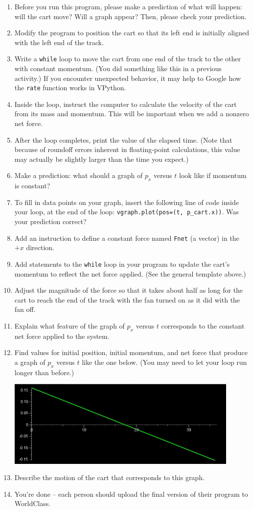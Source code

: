 \documentclass[11pt]{article}
\begin{document}
\begin{enumerate}
\item Before you run this program, please make a prediction of what will
happen: will the cart move?  Will a graph appear?  
Then, please check your prediction.
\item Modify the program to position the cart so that its left end is initially 
aligned with the left end of the track.
\item  Write a {\texttt{while}} loop to move the cart from one end of the track to the other with constant momentum.  (You did something like this in 
a previous activity.) If you encounter unexpected behavior, it may help to Google how the \texttt{rate} function works in VPython.
\item Inside the loop, instruct the computer to calculate the velocity of the cart from its mass and momentum. This will be important when we add a nonzero net force.
\item After the loop completes, print the value of the elapsed time. (Note that because of roundoff errors inherent in floating-point calculations, this value may actually be slightly larger than the time you expect.)
\item Make a prediction: what should a graph of $p_x$ versus $t$ look like if momentum is constant? 
\item To fill in data points on your graph, insert the following line of code inside your loop, at the end of the loop: {\texttt{vgraph.plot(pos=(t, p\_cart.x))}}.  Was your prediction correct?
\item Add an instruction to define a constant force named {\texttt{Fnet}} (a vector) in the $+x$ direction. 
\item Add statements to the {\texttt{while}} loop in your program to update the cart's momentum to reflect the net force applied.  (See the general template above.)
\item Adjust the magnitude of the force so that it takes about half as long for the cart to reach the end of the track
with the fan turned on as it did with the fan off.
\item Explain what feature of the graph of $p_x$ versus $t$ corresponds to the constant net force applied to the system.
\item Find values for initial position, initial momentum, and net force that produce a graph of $p_x$ versus $t$ like the one below.  (You may need to let your loop run longer than before.)

\includegraphics[width=0.9\textwidth]{px_vs_t_2.JPG}

\item Describe the motion of the cart that corresponds to this graph.

\item You're done -- each person should upload the final version of their program to
  WorldClass.

\end{enumerate}
\end{document}
